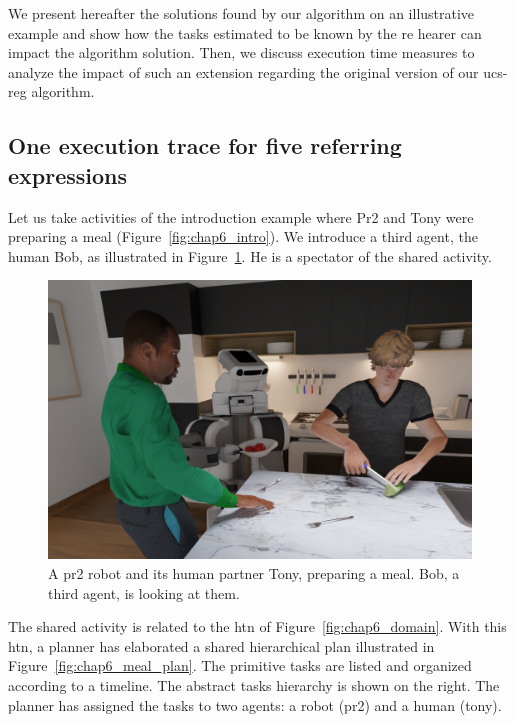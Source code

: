 We present hereafter the solutions found by our algorithm on an illustrative example and show how the tasks estimated to be known by the \acrshort{re} hearer can impact the algorithm solution. Then, we discuss execution time measures to analyze the impact of such an extension regarding the original version of our \acrshort{ucs}-\acrshort{reg} algorithm.

\subsection{One execution trace for five referring expressions}

Let us take activities of the introduction example where Pr2 and Tony were preparing a meal (Figure~\ref{fig:chap6_intro}). We introduce a third agent, the human Bob, as illustrated in Figure~\ref{fig:chap6_bob}. He is a spectator of the shared activity.

\begin{figure}[ht!]
\centering
\includegraphics[width=\textwidth]{figures/chapter6/bob.png}
\caption{\label{fig:chap6_bob} A pr2 robot and its human partner Tony, preparing a meal. Bob, a third agent, is looking at them.}
\end{figure}

The shared activity is related to the \acrshort{htn} of Figure~\ref{fig:chap6_domain}. With this \acrshort{htn}, a planner has elaborated a shared hierarchical plan illustrated in Figure~\ref{fig:chap6_meal_plan}. The primitive tasks are listed and organized according to a timeline. The abstract tasks hierarchy is shown on the right. The planner has assigned the tasks to two agents: a robot (pr2) and a human (tony).
 
